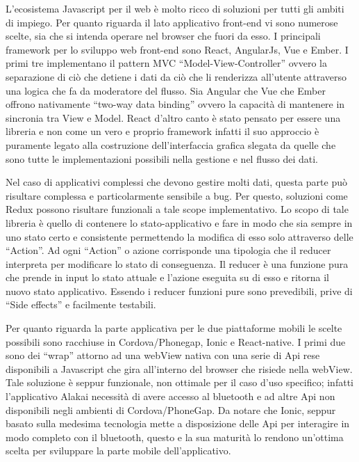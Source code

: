 	L’ecosistema Javascript per il web è molto ricco di soluzioni per tutti gli ambiti di impiego. Per quanto riguarda il lato applicativo front-end vi sono numerose scelte, sia che si intenda operare nel browser che fuori da esso. I principali framework per lo sviluppo web front-end sono React, AngularJs, Vue e Ember. I primi tre implementano il pattern MVC “Model-View-Controller” ovvero la separazione di ciò che detiene i dati da ciò che li renderizza all’utente attraverso una logica che fa da moderatore del flusso. Sia Angular che Vue che Ember offrono nativamente “two-way data binding” ovvero la capacità di mantenere in sincronia tra View e Model. React d’altro canto è stato pensato per essere una libreria e non come un vero e proprio framework infatti il suo approccio è puramente legato alla costruzione dell’interfaccia grafica slegata da quelle che sono tutte le implementazioni possibili nella gestione e nel flusso dei dati. \vspace{5mm}

Nel caso di applicativi complessi che devono gestire molti dati, questa parte può risultare complessa e particolarmente sensibile a bug. Per questo, soluzioni come Redux possono risultare funzionali a tale scope implementativo. Lo scopo di tale libreria è quello di contenere lo stato-applicativo e fare in modo che sia sempre in uno stato certo e consistente permettendo la modifica di esso solo attraverso delle “Action”. Ad ogni “Action” o azione corrisponde una tipologia che il reducer interpreta per modificare lo stato di conseguenza. Il reducer è una funzione pura che prende in input lo stato attuale e l’azione eseguita su di esso e ritorna il nuovo stato applicativo. Essendo i reducer funzioni pure sono prevedibili, prive di “Side effects” e facilmente testabili.\vspace{5mm} 

Per quanto riguarda la parte applicativa per le due piattaforme mobili le scelte possibili sono racchiuse in Cordova/Phonegap, Ionic e React-native. I primi due sono dei “wrap” attorno ad una webView nativa con una serie di Api rese disponibili a Javascript che gira all’interno del browser che risiede nella webView. Tale soluzione è seppur funzionale, non ottimale per il caso d’uso specifico; infatti l’applicativo Alakai necessità di avere accesso al bluetooth e ad altre Api non disponibili negli ambienti di Cordova/PhoneGap. Da notare che Ionic, seppur basato sulla medesima tecnologia mette a disposizione delle Api per interagire in modo completo con il bluetooth, questo e la sua maturità lo rendono un'ottima scelta per sviluppare la parte mobile dell’applicativo.\vspace{5mm} 


